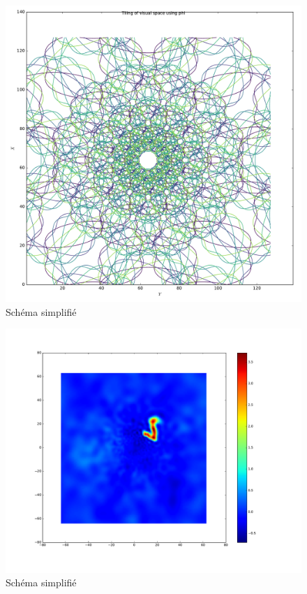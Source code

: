 \begin{figure}[th]
\centering
\includegraphics[scale=0.4]{Figures/logpol_filter}
\decoRule
\caption[Figure]{Schéma simplifié}
\label{fig:logpol_filter}
\end{figure}

\begin{figure}[th]
\centering
\includegraphics[scale=0.4]{Figures/mnist_128_LP}
\decoRule
\caption[Figure]{Schéma simplifié}
\label{fig:mnist_128_LP}
\end{figure}

